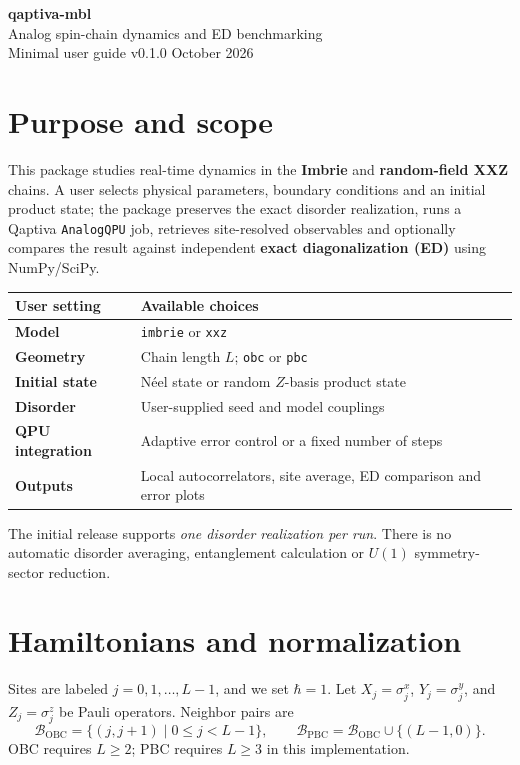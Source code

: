 \documentclass[10pt,a4paper]{article}
\newcommand{\Bonds}{\mathcal B}
\begin{document}
\begin{center}
{\fontsize{22}{26}\selectfont\sffamily\bfseries\color{ink} qaptiva-mbl}\\[5pt]
{\large\sffamily\color{accent} Analog spin-chain dynamics and ED benchmarking}\\[8pt]
{\normalsize\color{muted} Minimal user guide \quad\textbar\quad v0.1.0 \quad\textbar\quad October 2026}
\end{center}
\vspace{10pt}

\section{Purpose and scope}
This package studies real-time dynamics in the \textbf{Imbrie} and \textbf{random-field XXZ} chains. A user selects physical parameters, boundary conditions and an initial product state; the package preserves the exact disorder realization, runs a Qaptiva \texttt{AnalogQPU} job, retrieves site-resolved observables and optionally compares the result against independent \textbf{exact diagonalization (ED)} using NumPy/SciPy.

\begin{tabularx}{\textwidth}{@{}>{\bfseries}p{38mm}X@{}}
\toprule
User setting & Available choices \\
\midrule
Model & \texttt{imbrie} or \texttt{xxz} \\
Geometry & Chain length $L$; \texttt{obc} or \texttt{pbc} \\
Initial state & N\'eel state or random $Z$-basis product state \\
Disorder & User-supplied seed and model couplings \\
QPU integration & Adaptive error control or a fixed number of steps \\
Outputs & Local autocorrelators, site average, ED comparison and error plots \\
\bottomrule
\end{tabularx}

The initial release supports \emph{one disorder realization per run}. There is no automatic disorder averaging, entanglement calculation or $U(1)$ symmetry-sector reduction.

\section{Hamiltonians and normalization}
Sites are labeled $j=0,1,\ldots,L-1$, and we set $\hbar=1$. Let $X_j=\sigma_j^x$, $Y_j=\sigma_j^y$, and $Z_j=\sigma_j^z$ be Pauli operators. Neighbor pairs are
\begin{equation}
\Bonds_{\mathrm{OBC}}=\{(j,j+1)\mid 0\le j<L-1\},\qquad
\Bonds_{\mathrm{PBC}}=\Bonds_{\mathrm{OBC}}\cup\{(L-1,0)\}.
\end{equation}
OBC requires $L\ge2$; PBC requires $L\ge3$ in this implementation.
\end{document}
